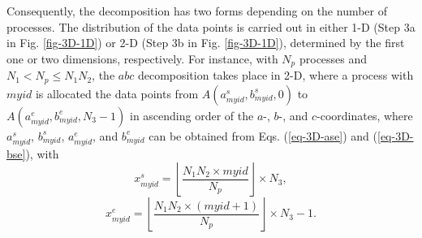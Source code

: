 Consequently, the decomposition has two forms depending on the number of processes. The distribution of the data points is carried out in either 1-D (Step 3a in Fig. \ref{fig-3D-1D}) or 2-D (Step 3b in Fig. \ref{fig-3D-1D}), determined by the first one or two dimensions, respectively. For instance, with $N_p$ processes and $N_1 < N_p \leq N_1N_2$, the $abc$ decomposition takes place in 2-D, where a process with $myid$ is allocated the data points from $A(a^{s}_{myid},b^{s}_{myid}, 0)$ to $A(a^{e}_{myid},b^{e}_{myid}, N_{\mathrm{3}}-1)$ in ascending order of the $a$-, $b$-, and $c$-coordinates, where $a^{s}_{myid}$, $b^{s}_{myid}$, $a^{e}_{myid}$, and $b^{e}_{myid}$ can be obtained from Eqs. (\ref{eq-3D-ase}) and (\ref{eq-3D-bse}), with
\begin{equation}
x^{s}_{myid}=\left \lfloor \frac{N_1N_2 \times myid}{N_p} \right \rfloor \times N_3,
\end{equation}
\begin{equation}
x^{e}_{myid}=\left \lfloor \frac{N_1N_2 \times (myid+1)}{N_p} \right \rfloor \times N_3-1.
\end{equation}
\begin{comment}
\begin{equation}
\label{eq-3D-s}
a^{s}_{myid}N_{\mathrm{2}}+b^{s}_{myid}=\left \lfloor \frac{myid \times N_{\mathrm{1}}N_{\mathrm{2}}+N_{\mathrm{p}}-1}{N_{\mathrm{p}}} \right \rfloor
\end{equation}
\begin{equation}
\label{eq-3D-e}
a^{e}_{myid} N_{\mathrm{2}}+b^{e}_{myid}=\left \lfloor \frac{(myid+1) \times N_{\mathrm{1}}N_{\mathrm{2}}+N_{\mathrm{p}}-1}{N_{\mathrm{p}}} -1\right \rfloor,
\end{equation}
\begin{equation}
a^{s}_{myid}=\left \lfloor \frac{\left \lfloor \frac{N_1N_2 \times myid}{N_p} \right \rfloor \times N_3}{N_2N_3} \right \rfloor
\end{equation}
\begin{equation}
a^{e}_{myid}=\left \lfloor \frac{\left \lfloor \frac{N_1N_2 \times (myid+1)}{N_p} \right \rfloor \times N_3-1}{N_2N_3} \right \rfloor
\end{equation}
\begin{equation}
b^{s}_{myid}=\left \lfloor \frac{\left \lfloor \frac{N_1N_2 \times myid}{N_p} \right \rfloor \times N_3-a^{s}_{myid}N_2N_3}{N_3} \right \rfloor
\end{equation}
\end{comment}

